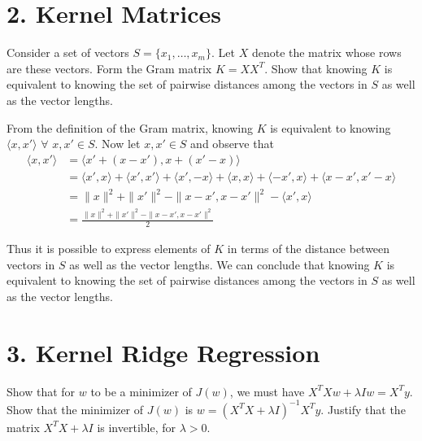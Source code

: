 \documentclass[12pt,letterpaper]{article}
\begin{document}
\newenvironment{solution}[2][Solution]{\begin{trivlist}
\item[\hskip \labelsep {\bfseries #1}]}{\end{trivlist}}
\newenvironment{problem}[2][Problem]{\begin{trivlist}
\item[\hskip \labelsep {\bfseries #1}\hskip \labelsep {\bfseries #2.}]}{\end{trivlist}}


\section*{2. Kernel Matrices}

\begin{problem}{2.1}

Consider a set of vectors $S=\{x_{1},\ldots,x_{m}\}$.
Let $X$ denote the matrix whose rows are these vectors. Form the
Gram matrix $K=XX^{T}$. Show that knowing $K$ is equivalent to knowing
the set of pairwise distances among the vectors in $S$ as well as
the vector lengths.
\end{problem}



\begin{solution}{}
From the definition of the Gram matrix, knowing $K$ is equivalent to knowing
$\langle x, x' \rangle\,\, \forall\,\, x,x' \in S$. Now let $x,x' \in S$ and observe that
\begin{align*}
    \langle x,x' \rangle &= \langle x'+(x-x'), x+(x'-x) \rangle\\
    &= \langle x', x\rangle + \langle x', x'\rangle + \langle x', -x\rangle + \langle x, x\rangle + \langle -x', x\rangle + \langle x - x', x'-x\rangle\\
    &= \|x\|^2 + \|x'\|^2 - \|x-x', x-x'\|^2 - \langle x',x \rangle\\
    &= \frac{\|x\|^2 + \|x'\|^2 - \|x-x', x-x'\|^2}{2}
\end{align*}

Thus it is possible to express elements of $K$ in terms of the distance between vectors in $S$ as well as the vector lengths. We can conclude that
knowing $K$ is equivalent to knowing the set of pairwise distances among the vectors in $S$ as well as the vector lengths.
\end{solution}
\newpage


\section*{3. Kernel Ridge Regression}
\begin{problem}{3.1}
Show that for $w$ to be a minimizer of $J(w)$, we must have $X^{T}Xw+\lambda Iw=X^{T}y$.
Show that the minimizer of $J(w)$ is $w=(X^{T}X+\lambda I)^{-1}X^{T}y$.
Justify that the matrix $X^{T}X+\lambda I$ is invertible, for $\lambda>0$.
\end{problem}
\end{document}
